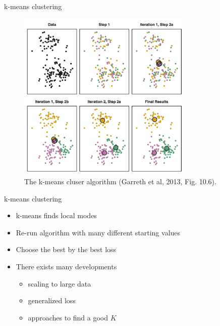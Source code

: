 \documentclass[10pt]{beamer}
\begin{document}
\begin{frame}{k-means clustering}

\begin{figure}[h]
\centering
\includegraphics[width=0.75\textwidth]{fig/fig_10_6_kmeans_algo.png}
\caption{The k-means cluser algorithm (Garreth et al, 2013, Fig. 10.6).}
\end{figure}

\end{frame}


\begin{frame}{k-means clustering}

\begin{itemize}
\item k-means finds {\color{uured} local modes}
\item Re-run algorithm with many {\color{uured} different starting values}
\item Choose the best by the best loss
\pause
\item There exists many developments
\begin{itemize}
\item scaling to large data
\item generalized loss
\item approaches to find a good $K$
\end{itemize}
\end{itemize}
\end{frame}
\end{document}
